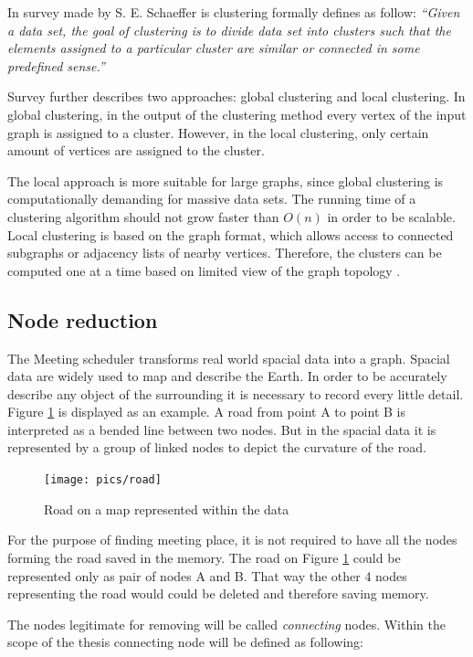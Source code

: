 \documentclass[thesis=M,english]{FITthesis}[2012/10/20]
\begin{document}
In survey made by S. E. Schaeffer \cite{Schaeffer07} is clustering formally defines as follow: \textit{``Given a data set, the goal of clustering is to divide data set into clusters such that the elements assigned to a particular cluster are similar or connected in some predefined sense.''}

Survey further describes two approaches: global clustering and local clustering. In global clustering, in the output of the clustering method every vertex of the input graph is assigned to a cluster. However, in the local clustering, only certain amount of vertices are assigned to the cluster. 

The local approach is more suitable for large graphs, since global clustering is computationally demanding for massive data sets. The running time of a clustering algorithm should not grow faster than $O(n)$ in order to be scalable. Local clustering is based on the graph format, which allows access to connected subgraphs or adjacency lists of nearby vertices. Therefore, the clusters can be computed one at a time based on limited view of the graph topology \cite{Schaeffer07}.




\subsection{Node reduction}
\label{sec:NodeReduction}
The Meeting scheduler transforms real world spacial data into a graph. Spacial data are widely used to map and describe the Earth. In order to be accurately describe any object of the surrounding it is necessary to record every little detail. Figure \ref{pic:Road} is displayed as an example. A road from point A to point B is interpreted as a bended line between two nodes. But in the spacial data it is represented by a group of linked nodes to depict the curvature of the road.

\begin{figure}[H]
\centering
\texttt{[image: pics/road]}
\caption{Road on a map represented within the data}
\label{pic:Road}
\end{figure}

For the purpose of finding meeting place, it is not required to have all the nodes forming the road saved in the memory. The road on Figure \ref{pic:Road} could be represented only as pair of nodes A and B. That way the other 4 nodes representing the road would could be deleted and therefore saving memory. 

The nodes legitimate for removing will be called \textit{connecting} nodes. Within the scope of the thesis connecting node will be defined as following:
\end{document}
